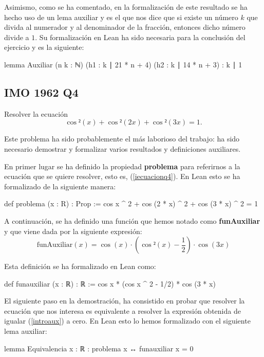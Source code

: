 Asimismo, como se ha comentado, en la formalización de este resultado se
ha hecho uso de un lema auxiliar y es el que nos dice que si existe un
número \(k\) que divida al numerador y al denominador de la fracción,
entonces dicho número divide a \(1\). Su formalización en Lean ha sido
necesaria para la conclusión del ejercicio y es la siguiente:
\begin{leancode}
lemma Auxiliar
  (n k : ℕ)
  (h1 : k ∣ 21 * n + 4)
  (h2 : k ∣ 14 * n + 3)
  : k ∣ 1
\end{leancode}

\subsection{IMO 1962 Q4}

\noindent
Resolver la ecuación
\begin{equation}\label{iecuacionq4}
  \cos²(x)+\cos²(2x)+\cos²(3x)=1.
\end{equation}

Este problema ha sido probablemente el más laborioso del trabajo: ha
sido necesario demostrar y formalizar varios resultados y definiciones
auxiliares.

En primer lugar se ha definido la propiedad \textbf{problema} para
referirnos a la ecuación que se quiere resolver, esto es,
(\ref{iecuacionq4}). En Lean esto se ha formalizado de la siguiente
manera:
\begin{leancode}
def problema (x : R) : Prop :=
  cos x ^ 2 + cos (2 * x) ^ 2 + cos (3 * x) ^ 2 = 1
\end{leancode}

A continuación, se ha definido una función que hemos notado como
\textbf{funAuxiliar} y que viene dada por la siguiente expresión:
\begin{equation}\label{introaux}
  \text{funAuxiliar}(x)=\cos(x)·\left(\cos²(x)-\frac{1}{2}\right)·\cos(3x)
\end{equation}

Esta definición se ha formalizado en Lean como:
\begin{leancode}
def funauxiliar (x : ℝ) : ℝ :=
  cos x * (cos x ^ 2 - 1/2) * cos (3 * x)
\end{leancode}

El siguiente paso en la demostración, ha consistido en probar que
resolver la ecuación que nos interesa es equivalente a resolver la
expresión obtenida de igualar (\ref{introaux}) a cero. En Lean esto lo
hemos formalizado con el siguiente lema auxiliar:
\begin{leancode}
lemma Equivalencia
  {x : ℝ}
  : problema x ↔ funauxiliar x = 0
\end{leancode}

